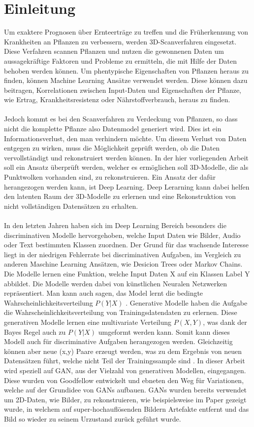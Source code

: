 \documentclass{llncs}
\begin{document}
\section{Einleitung}%
Um exaktere Prognosen über Ernteerträge zu treffen und die Früherkennung von Krankheiten an Pflanzen zu verbessern, werden 3D-Scanverfahren eingesetzt. Diese Verfahren scannen Pflanzen und nutzen die gewonnenen Daten um aussagekräftige Faktoren und Probleme zu ermitteln, die mit Hilfe der Daten behoben werden können. Um phentypische Eigenschaften von Pflanzen heraus zu finden, können Machine Learning Ansätze verwendet werden. Diese können dazu beitragen, Korrelationen zwischen Input-Daten und Eigenschaften der Pflanze, wie Ertrag, Krankheitsresistenz oder Nährstoffverbrauch, heraus zu finden. 
\\\\
Jedoch kommt es bei den Scanverfahren zu Verdeckung von Pflanzen, so dass nicht die komplette Pflanze also Datenmodel generiert wird. Dies ist ein Informationsverlust, den man verhindern möchte. Um diesem Verlust von Daten entgegen zu wirken, muss die Möglichkeit geprüft werden, ob die Daten vervollständigt und rekonstruiert werden können. In der hier vorliegenden Arbeit soll ein Ansatz überprüft werden, welcher es ermöglichen soll 3D-Modelle, die als Punktwolken vorhanden sind, zu rekonstruieren. Ein Ansatz der dafür herangezogen werden kann, ist Deep Learning. Deep Lerarning kann dabei helfen den latenten Raum der 3D-Modelle zu erlernen und eine Rekonstruktion von nicht vollständigen Datensätzen zu erhalten. 
\\\\
In den letzten Jahren haben sich im Deep Learning Bereich besonders die discriminativen Modelle hervorgehoben, welche Input Daten wie Bilder, Audio oder Text bestimmten Klassen zuordnen. Der Grund für das wachsende Interesse liegt in der niedrigen Fehlerrate bei discriminativen Aufgaben, im Vergleich zu anderen Maschine Learning Ansätzen, wie Desicion Trees oder Markov Chains\cite{Grundlagen}. Die Modelle lernen eine Funktion, welche Input Daten X auf ein Klassen Label Y abbildet. Die Modelle werden dabei von künstlichen Neuralen Netzwerken repräsentiert. Man kann auch sagen, das Model lernt die bedingte Wahrscheinlichkeitsverteilung $P(Y|X)$ \cite{discrim}. Generative Modelle haben die Aufgabe die Wahrscheinlichkeitsverteilung von Trainingsdatendaten zu erlernen. Diese generativen Modelle lernen eine multivariate Verteilung $P(X,Y)$, was dank der Bayes Regel auch zu $P(Y|X)$ umgeformt werden kann. Somit kann dieses Modell auch für discriminative Aufgaben herangezogen werden. Gleichzeitig können aber neue (x,y) Paare erzeugt werden, was zu dem Ergebnis von neuen Datensätzen führt, welche nicht Teil der Trainingssample sind \cite{discrim}. In dieser Arbeit wird speziell auf GAN, aus der Vielzahl von generativen Modellen, eingegangen. Diese wurden von Goodfellow\cite{goodfellow2014} entwickelt und ebneten den Weg für Variationen, welche auf der Grundidee von GANs aufbauen. GANs wurden bereits verwendet um 2D-Daten, wie Bilder, zu rekonstruieren, wie beispielsweise im Paper \cite{imagere1} gezeigt wurde, in welchem auf super-hochauflösenden Bildern Artefakte entfernt und das Bild so wieder zu seinem Urzustand zurück geführt wurde.
\end{document}
